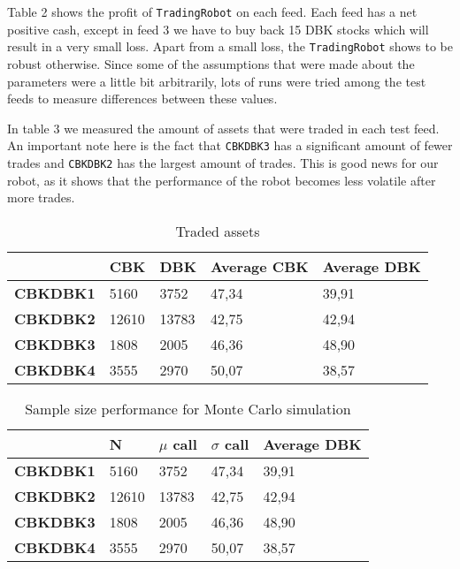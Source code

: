 \documentclass[a4paper]{article}
\begin{document}
Table 2 shows the profit of \texttt{TradingRobot} on each feed. Each feed has a net positive cash, except in feed 3 we have to buy back 15 DBK stocks which will result in a very small loss. Apart from a small loss, the \texttt{TradingRobot} shows to be robust otherwise. Since some of the assumptions that were made about the parameters were a little bit arbitrarily, lots of runs were tried among the test feeds to measure differences between these values. 

In table 3 we measured the amount of assets that were traded in each test feed. An important note here is the fact that \texttt{CBKDBK3} has a significant amount of fewer trades and \texttt{CBKDBK2} has the largest amount of trades. This is good news for our robot, as it shows that the performance of the robot becomes less volatile after more trades.

\begin{table}[tbp]
\centering
\caption{Traded assets}
\label{my-label2}
\begin{tabular}{lllll}
\hline
                 & \textbf{CBK} & \textbf{DBK} & \textbf{Average CBK} & \textbf{Average DBK} \\
\hline                 
\textbf{CBKDBK1} & 5160         & 3752         & 47,34                & 39,91                \\
\textbf{CBKDBK2} & 12610        & 13783        & 42,75                & 42,94                \\
\textbf{CBKDBK3} & 1808         & 2005         & 46,36                & 48,90                \\
\textbf{CBKDBK4} & 3555         & 2970         & 50,07                & 38,57      \\         
\hline
\end{tabular}
\end{table}



\begin{table}[tbp]
\centering
\caption{Sample size performance for Monte Carlo simulation}
\label{my-label13}
\begin{tabular}{lllll}
\hline
  		& \textbf{N} & \textbf{$\mu$ call} & \textbf{$\sigma$ call} & \textbf{Average DBK} \\
\hline                 
\textbf{CBKDBK1} & 5160         & 3752         & 47,34                & 39,91                \\
\textbf{CBKDBK2} & 12610        & 13783        & 42,75                & 42,94                \\
\textbf{CBKDBK3} & 1808         & 2005         & 46,36                & 48,90                \\
\textbf{CBKDBK4} & 3555         & 2970         & 50,07                & 38,57      \\         
\hline
\end{tabular}
\end{table}
\end{document}
